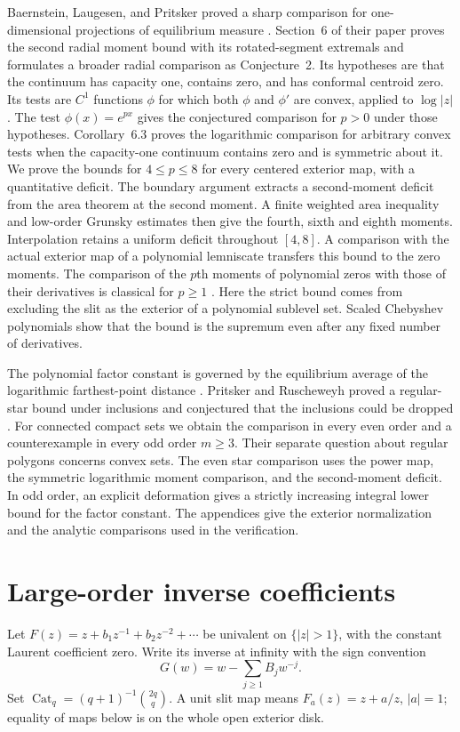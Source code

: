 \documentclass[11pt]{article}
\newcommand{\Cat}{\operatorname{Cat}}
\begin{document}
	Baernstein, Laugesen, and Pritsker proved a sharp comparison for
	one-dimensional projections of equilibrium measure
	\cite[Theorem~2]{BLP}. Section~6 of their paper proves the second
	radial moment bound with its rotated-segment extremals and formulates
	a broader radial comparison as Conjecture~2. Its hypotheses are that
	the continuum has capacity one, contains zero, and has conformal
	centroid zero. Its tests are $C^1$ functions $\phi$ for which both
	$\phi$ and $\phi'$ are convex, applied to $\log|z|$. The test
	$\phi(x)=e^{px}$ gives the conjectured comparison for $p>0$ under
	those hypotheses. Corollary~6.3 proves the logarithmic comparison
	for arbitrary convex tests when the capacity-one continuum contains
	zero and is symmetric about it. We prove the bounds for $4\leq p\leq8$
	for every centered exterior map, with a quantitative deficit.
	The boundary argument extracts a second-moment deficit
	from the area theorem at the second moment. A finite weighted area
	inequality and low-order Grunsky estimates then give the fourth,
	sixth and eighth moments. Interpolation retains a uniform deficit
	throughout \([4,8]\). A comparison with the actual exterior map of
	a polynomial lemniscate transfers this bound to the zero moments.
	The comparison of the $p$th moments of polynomial zeros with those
	of their derivatives is classical for $p\geq1$ \cite[Theorem~4]{DBS1947}.
	Here the strict bound comes from excluding the slit as the exterior of
	a polynomial sublevel set. Scaled Chebyshev polynomials show that
	the bound is the supremum even after any fixed number of derivatives.
	
	The polynomial factor constant is governed by the equilibrium
	average of the logarithmic farthest-point distance
	\cite[Theorem~1.1]{PR2}. Pritsker and Ruscheweyh proved a regular-star
	bound under inclusions and conjectured that the inclusions could be
	dropped \cite[Theorem~2.2 and the discussion after Theorem~2.3]{PR2}.
	For connected compact sets we obtain the comparison in every even
	order and a counterexample in every odd order $m\geq3$. Their separate
	question about regular polygons concerns convex sets. The even star
	comparison uses the power map,
	the symmetric logarithmic moment comparison, and the second-moment
	deficit. In odd order, an explicit deformation gives a strictly
	increasing integral lower bound for the factor constant. The
	appendices give the exterior normalization and the analytic
	comparisons used in the verification.
	
	\section{Large-order inverse coefficients}\label{sec:large}
	Let $F(z)=z+b_1z^{-1}+b_2z^{-2}+\cdots$ be univalent on
	$\{|z|>1\}$, with the constant Laurent coefficient zero.  Write its
	inverse at infinity with the sign convention
	\[
	G(w)=w-\sum_{j\geq1}B_jw^{-j}.
	\]
	Set $\Cat_q=(q+1)^{-1}\binom{2q}{q}$.  A unit slit map means
	$F_a(z)=z+a/z$, $|a|=1$; equality of maps below is on the whole open
	exterior disk.
	
\end{document}

